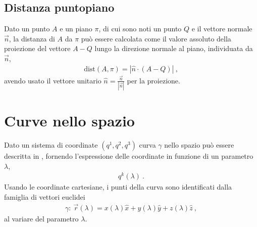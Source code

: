 \documentclass[letterpaper,10pt,english]{jupyterBook}
\begin{document}
\subsection{Distanza punto\sphinxhyphen{}piano}
\label{\detokenize{ch/analytic_geometry/analytic_geometry_3d/planes:distanza-punto-piano}}
\sphinxAtStartPar
Dato un punto \(A\) e un piano \(\pi\), di cui sono noti un punto \(Q\) e il vettore normale \(\vec{n}\), la distanza di \(A\) da \(\pi\) può essere calcolata come il valore assoluto della proiezione del vettore \(A-Q\) lungo la direzione normale al piano, individuata da \(\vec{n}\),
\begin{equation*}
\begin{split}\text{dist}(A,\pi) = \left| \hat{n} \cdot (A-Q) \right| \ ,\end{split}
\end{equation*}
\sphinxAtStartPar
avendo usato il vettore unitario \(\hat{n} = \frac{\vec{n}}{|\vec{n}|}\) per la proiezione.

\sphinxstepscope


\section{Curve nello spazio}
\label{\detokenize{ch/analytic_geometry/analytic_geometry_3d/curves:curve-nello-spazio}}\label{\detokenize{ch/analytic_geometry/analytic_geometry_3d/curves:geometry-analytic-3d-curves}}\label{\detokenize{ch/analytic_geometry/analytic_geometry_3d/curves::doc}}
\sphinxAtStartPar
Dato un sistema di coordinate \((q^1, q^2, q^3)\) curva \(\gamma\) nello spazio può essere descritta in , fornendo l’espressione delle coordinate in funzione di un parametro \(\lambda\),
\begin{equation*}
\begin{split}q^k(\lambda) \ .\end{split}
\end{equation*}
\sphinxAtStartPar
Usando le coordinate cartesiane, i punti della curva sono identificati dalla famiglia di vettori euclidei
\begin{equation*}
\begin{split}\gamma: \ \vec{r}(\lambda) = x(\lambda) \hat{x} + y(\lambda) \hat{y} + z(\lambda) \hat{z} \ ,\end{split}
\end{equation*}
\sphinxAtStartPar
al variare del parametro \(\lambda\).

\sphinxstepscope
\end{document}
